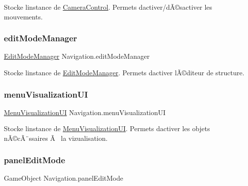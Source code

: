 Stocke l\textquotesingle{}instance de \mbox{\hyperlink{class_camera_control}{Camera\+Control}}. Permets d\textquotesingle{}activer/dÃ©sactiver les mouvements. 

\mbox{\label{class_navigation_a59344933bd9a22b16612407dee4e8aa5}} 
\subsubsection{\texorpdfstring{edit\+Mode\+Manager}{editModeManager}}
{\footnotesize\ttfamily \mbox{\hyperlink{class_edit_mode_manager}{Edit\+Mode\+Manager}} Navigation.\+edit\+Mode\+Manager\hspace{0.3cm}{\ttfamily [private]}}



Stocke l\textquotesingle{}instance de \mbox{\hyperlink{class_edit_mode_manager}{Edit\+Mode\+Manager}}. Permets d\textquotesingle{}activer l\textquotesingle{}Ã©diteur de structure. 

\mbox{\label{class_navigation_affdf26928cacf9c7582cb21ff6bf85dd}} 
\subsubsection{\texorpdfstring{menu\+Visualization\+UI}{menuVisualizationUI}}
{\footnotesize\ttfamily \mbox{\hyperlink{class_menu_visualization_u_i}{Menu\+Visualization\+UI}} Navigation.\+menu\+Visualization\+UI\hspace{0.3cm}{\ttfamily [private]}}



Stocke l\textquotesingle{}instance de \mbox{\hyperlink{class_menu_visualization_u_i}{Menu\+Visualization\+UI}}. Permets d\textquotesingle{}activer les objets nÃ©cÃ¨ssaires Ã  la vizualisation. 

\mbox{\label{class_navigation_aa095d3e8d992350e8452f4c91ca607c9}} 
\subsubsection{\texorpdfstring{panel\+Edit\+Mode}{panelEditMode}}
{\footnotesize\ttfamily Game\+Object Navigation.\+panel\+Edit\+Mode\hspace{0.3cm}{\ttfamily [private]}}



